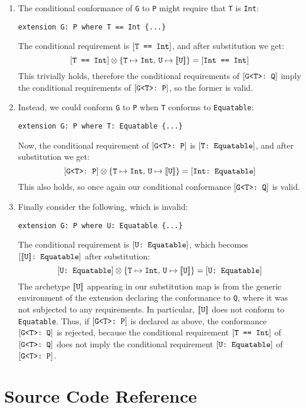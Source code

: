 \documentclass[../generics]{subfiles}
\begin{document}
\begin{enumerate}
\item
The conditional conformance of \texttt{G} to \texttt{P} might require that \texttt{T} is \texttt{Int}:
\begin{Verbatim}
extension G: P where T == Int {...}
\end{Verbatim}
The conditional requirement is $[\texttt{T == Int}]$, and after substitution we get:
\[[\texttt{T == Int}]\otimes \{\texttt{T} \mapsto \texttt{Int},\,\texttt{U} \mapsto \texttt{$[\![\texttt{U}]\!]$}\}=[\texttt{Int == Int}]\]
This trivially holds, therefore the conditional requirements of $[\texttt{G<T>:~Q}]$ imply the conditional requirements of $[\texttt{G<T>:~P}]$, so the former is valid.

\item Instead, we could conform \texttt{G} to \texttt{P} when \texttt{T} conforms to \texttt{Equatable}:
\begin{Verbatim}
extension G: P where T: Equatable {...}
\end{Verbatim}
Now, the conditional requirement of $[\texttt{G<T>:~P}]$ is $[\texttt{T:~Equatable}]$, and after substitution we get:
\[[\texttt{G<T>:~P}]\otimes\{\texttt{T} \mapsto \texttt{Int},\,\texttt{U} \mapsto \texttt{$[\![\texttt{U}]\!]$}\}=[\texttt{Int:~Equatable}]\]
This also holds, so once again our conditional conformance $[\texttt{G<T>:~Q}]$ is valid.

\item Finally consider the following, which is invalid:
\begin{Verbatim}
extension G: P where U: Equatable {...}
\end{Verbatim}
The conditional requirement is $[\texttt{U:~Equatable}]$, which becomes $[\texttt{$[\![\texttt{U}]\!]$:~Equatable}]$ after substitution:
\[[\texttt{U:~Equatable}]\otimes \{\texttt{T} \mapsto \texttt{Int},\,\texttt{U} \mapsto \texttt{$[\![\texttt{U}]\!]$}\}=[\texttt{U:~Equatable}]\]
The archetype $[\![\texttt{U}]\!]$ appearing in our substitution map is from the generic environment of the extension declaring the conformance to \verb|Q|, where it was not subjected to any requirements. In particular, $[\![\texttt{U}]\!]$ does not conform to \texttt{Equatable}. Thus, if $[\texttt{G<T>:~P}]$ is declared as above, the conformance $[\texttt{G<T>:~Q}]$ is rejected, because the conditional requirement $[\texttt{T == Int}]$ of $[\texttt{G<T>:~Q}]$ does not imply the conditional requirement $[\texttt{U:~Equatable}]$ of $[\texttt{G<T>:~P}]$.
\end{enumerate}

\section{Source Code Reference}\label{extensionssourceref}
\end{document}
